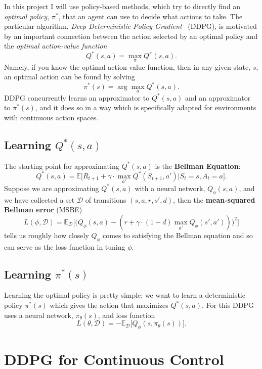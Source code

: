 \documentclass[sigchi]{acmart}
\begin{document}
In this project I will use policy-based methods, which try to directly  find an {\em optimal policy}, $\pi^*$,  that an agent can use to decide what actions to take.  The
particular algorithm,
 {\em Deep Deterministic Policy Gradient}~\cite{Silver:2014:DPG:3044805.3044850} (DDPG),
is motivated by an important connection between the action selected by an optimal policy and the {\em optimal action-value function} 
	$$Q^*(s, a) =  \max_{\pi}Q^{\pi}(s,a).$$
Namely, if you know the optimal action-value function, then in any given state, $s$, an optimal action can be found by solving
	 $$\pi^*(s) = \arg\max_a Q^*(s,a).$$
 DDPG concurrently learns an approximator to $Q^*(s,a)$ and an approximator to $\pi^*(s)$, and it does so in a way which is specifically adapted for environments with continuous action spaces. 

\subsection{Learning $Q^*(s,a)$}

The starting point for approximating $Q^*(s, a)$  is the \textbf{Bellman Equation}:
$$Q^{*}(s,a) = \mathbb{E}\big[R_{t+1}+\gamma\cdot \max_{a'}Q^{*}(S_{t+1},a')| S_t = s, A_t=a\big].$$
Suppose we are approximating $Q^*(s, a)$ with a neural network, $Q_\phi(s,a)$, and we have collected a set $\mathcal{D}$ of
transitions $(s, a, r, s', d)$, then the \textbf{mean-squared Bellman error} (MSBE)
		$$L(\phi, \mathcal{D}) = \mathbb{E}_{\mathcal{D}}\big[\big(Q_\phi(s,a)-(r+\gamma\cdot(1-d)\max_{a'}Q_\phi(s',a'))\big)^2\big]$$
tells us roughly how closely $Q_{\phi}$ comes to satisfying the Bellman equation and so can serve as the loss function in tuning $\phi$.

\subsection{Learning $\pi^*(s)$}

Learning the optimal policy is pretty simple: we want to learn a deterministic policy $\pi^*(s)$ which gives the action that maximizes $Q^*(s, a)$.
For this DDPG uses a neural network, $\pi_\theta(s)$, and loss function
$$L(\theta, \mathcal{D}) = -\mathbb{E}_{\mathcal{D}}\big[Q_\phi(s,\pi_\theta(s))\big].$$
 

\section{DDPG for Continuous Control}
\end{document}
